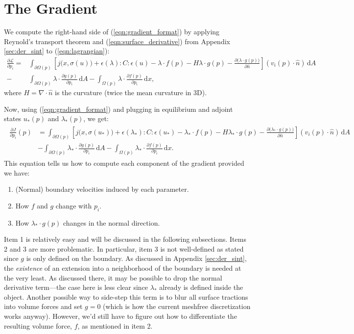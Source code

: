 \documentclass[10pt]{article}
\renewcommand{\div}{\nabla \cdot}
\providecommand{\shape}{\Omega(p)}
\providecommand{\boundary}{\partial \shape}
\providecommand{\vint}[1]{\int_{\shape} \! #1 \, \mathrm{d}x}
\providecommand{\sint}[1]{\int_{\boundary} \! #1 \, \mathrm{d}A}
\providecommand{\pder}[2]{\frac{\partial #1}{\partial #2}}
\begin{document}
\section{The Gradient}
We compute the right-hand side of (\ref{eqn:gradient_format}) by applying Reynold's
transport theorem and (\ref{eqn:surface_derivative}) from Appendix
\ref{sec:der_sint} to (\ref{eqn:lagrangian}):
\begin{align*}
    \pder{\mathcal{L}}{p_i} = &\sint{\left[j\big(x, \sigma(u)\big) + \epsilon(\lambda) : C : \epsilon(u) -
  \lambda \cdot f(p) - H \lambda \cdot g(p) - \pder{\big(\lambda \cdot g(p)\big)}{\hat{n}}\right] (v_i(p) \cdot \hat{n})} \\
  - &\sint{\lambda \cdot \pder{g(p)}{p_i}}
- \vint{\lambda \cdot \pder{f(p)}{p_i}},
\end{align*}
where $H = \div\hat{n}$ is the curvature (twice the mean curvature in 3D).

Now, using (\ref{eqn:gradient_format}) and plugging in equilibrium and adjoint states $u_*(p)$ and $\lambda_*(p)$, we get:
\begin{align}
    \begin{split}
        \pder{J}{p_i}(p) &= \sint{\left[j\big(x, \sigma(u_*)\big) + \epsilon(\lambda_*) : C : \epsilon(u_*) -
    \lambda_* \cdot f(p) - H \lambda_* \cdot g(p) - \pder{\big(\lambda_* \cdot g(p)\big)}{\hat{n}}\right] (v_i(p) \cdot \hat{n})} \\
   &-\sint{\lambda_* \cdot \pder{g(p)}{p_i}}
    - \vint{\lambda_* \cdot \pder{f(p)}{p_i}}.
    \end{split}
    \label{eqn:partials}
\end{align}
This equation tells us how to compute each component of the gradient provided we have:

\begin{enumerate}
    \item (Normal) boundary velocities induced by each parameter.
    \item How $f$ and $g$ change with $p_i$.
    \item How $\lambda_* \cdot g(p)$ changes in the normal direction.
\end{enumerate}
Item 1 is relatively easy and will be discussed in the following subsections.
Items 2 and 3 are more problematic. In particular, item 3 is not well-defined
as stated since $g$ is only defined on the boundary. As discussed in Appendix
\ref{sec:der_sint}, the {\it existence} of an extension into a neighborhood of
the boundary is needed at the very least. As discussed there, it may be
possible to drop the normal derivative term---the case here is less clear since
$\lambda_*$ already is defined inside the object. Another possible way to
side-step this term is to blur all surface tractions into volume forces and set
$g = 0$ (which is how the current meshfree discretization works anyway).
However, we'd still have to figure out how to differentiate the resulting
volume force, $f$, as mentioned in item 2.
\end{document}
